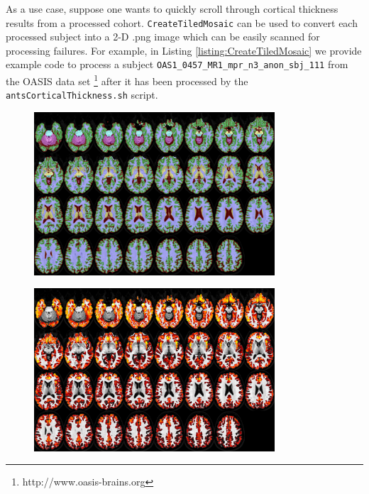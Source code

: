 \documentclass{InsightArticle}
\begin{document}
As a use case, suppose one wants
to quickly scroll through cortical thickness results from a processed cohort.  {\tt CreateTiledMosaic}
can be used to convert each processed subject into a 2-D .png image which can be easily scanned
for processing failures.  For example, in Listing \ref{listing:CreateTiledMosaic} we 
provide example code to process a subject {\tt OAS1\_0457\_MR1\_mpr\_n3\_anon\_sbj\_111} from the 
OASIS data set%
\footnote{
http://www.oasis-brains.org
}
after it has been processed by the {\tt antsCorticalThickness.sh} script.

\begin{figure}
\centering
\includegraphics[width=0.8\textwidth]{Figures/OAS1_0457_MR1_mpr_n3_anon_sbj_111_segTiledMosaic.png}
\label{fig:oasis_seg}
\end{figure}

\begin{figure}
\centering
\includegraphics[width=0.8\textwidth]{Figures/OAS1_0457_MR1_mpr_n3_anon_sbj_111_tiledMosaic.png}
\label{fig:oasis_thick}
\end{figure}
\end{document}
